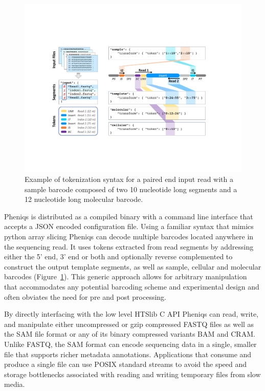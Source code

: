 \documentclass[twocolumn]{bmcart}
\begin{document}
\begin{figure}[h!]
\centering
\includegraphics[keepaspectratio,scale=0.7]{illumina_tokenization}
\caption{ Example of tokenization syntax for a paired end input read with a sample barcode composed of two 10 nucleotide long segments and a 12 nucleotide long molecular barcode.}
\label{fig:01}
\end{figure}

Pheniqs is distributed as a compiled binary with a command line interface that accepts a JSON encoded configuration file. Using a familiar syntax that mimics python array slicing Pheniqs can decode multiple barcodes located anywhere in the sequencing read. It uses tokens extracted from read segments by addressing either the 5’ end, 3’ end or both and optionally reverse complemented to construct the output template segments, as well as sample, cellular and molecular barcodes (Figure~\ref{fig:01}). This generic approach allows for arbitrary manipulation that accommodates any potential barcoding scheme and experimental design and often obviates the need for pre and post processing.

By directly interfacing with the low level HTSlib C API Pheniqs can read, write, and manipulate either uncompressed or gzip compressed FASTQ files as well as the SAM file format or any of its binary compressed variants BAM and CRAM. Unlike FASTQ, the SAM format can encode sequencing data in a single, smaller file that supports richer metadata annotations. Applications that consume and produce a single file can use POSIX standard streams to avoid the speed and storage bottlenecks associated with reading and writing temporary files from slow media.
\end{document}

